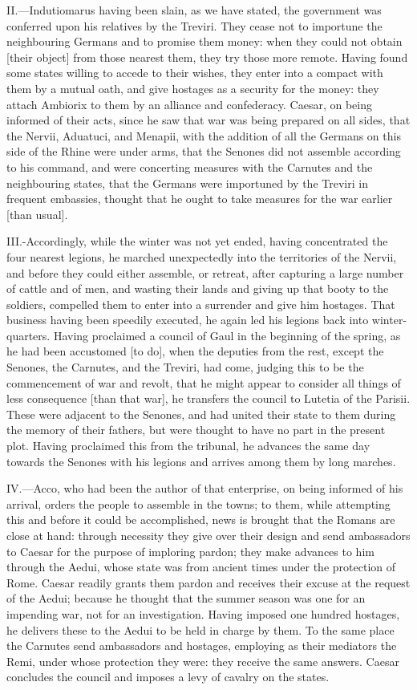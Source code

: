 II.—Indutiomarus having been slain, as we have stated, the government
was conferred upon his relatives by the Treviri. They cease not to
importune the neighbouring Germans and to promise them money: when they
could not obtain [their object] from those nearest them, they try those
more remote. Having found some states willing to accede to their wishes,
they enter into a compact with them by a mutual oath, and give hostages
as a security for the money: they attach Ambiorix to them by an alliance
and confederacy. Caesar, on being informed of their acts, since he saw
that war was being prepared on all sides, that the Nervii, Aduatuci, and
Menapii, with the addition of all the Germans on this side of the Rhine
were under arms, that the Senones did not assemble according to his
command, and were concerting measures with the Carnutes and the
neighbouring states, that the Germans were importuned by the Treviri in
frequent embassies, thought that he ought to take measures for the war
earlier [than usual].

III.-Accordingly, while the winter was not yet ended, having
concentrated the four nearest legions, he marched unexpectedly into the
territories of the Nervii, and before they could either assemble, or
retreat, after capturing a large number of cattle and of men, and
wasting their lands and giving up that booty to the soldiers, compelled
them to enter into a surrender and give him hostages. That business
having been speedily executed, he again led his legions back into
winter-quarters. Having proclaimed a council of Gaul in the beginning of
the spring, as he had been accustomed [to do], when the deputies from
the rest, except the Senones, the Carnutes, and the Treviri, had come,
judging this to be the commencement of war and revolt, that he might
appear to consider all things of less consequence [than that war], he
transfers the council to Lutetia of the Parisii. These were adjacent to
the Senones, and had united their state to them during the memory of
their fathers, but were thought to have no part in the present plot.
Having proclaimed this from the tribunal, he advances the same day
towards the Senones with his legions and arrives among them by long
marches.

IV.—Acco, who had been the author of that enterprise, on being informed
of his arrival, orders the people to assemble in the towns; to them,
while attempting this and before it could be accomplished, news is
brought that the Romans are close at hand: through necessity they give
over their design and send ambassadors to Caesar for the purpose of
imploring pardon; they make advances to him through the Aedui, whose
state was from ancient times under the protection of Rome. Caesar
readily grants them pardon and receives their excuse at the request of
the Aedui; because he thought that the summer season was one for an
impending war, not for an investigation. Having imposed one hundred
hostages, he delivers these to the Aedui to be held in charge by them.
To the same place the Carnutes send ambassadors and hostages, employing
as their mediators the Remi, under whose protection they were: they
receive the same answers. Caesar concludes the council and imposes a
levy of cavalry on the states.

